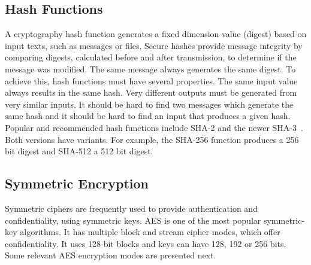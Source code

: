 \subsection{Hash Functions}\label{chap:background:crypto:hash}

A cryptography hash function generates a fixed dimension value (digest) based on input texts, such as messages or files. Secure hashes provide message integrity by comparing digests, calculated before and after transmission, to determine if the message was modified. The same message always generates the same digest.
To achieve this, hash functions must have several properties. The same input value always results in the same hash. Very different outputs must be generated from very similar inputs. It should be hard to find two messages which generate the same hash and it should be hard to find an input that produces a given hash.
Popular and recommended hash functions include \ac{SHA}-2 and the newer \ac{SHA}-3~\cite{dang2015secure}. Both versions have variants. For example, the \ac{SHA}-256 function produces a 256 bit digest and \ac{SHA}-512 a 512 bit digest.

\subsection{Symmetric Encryption}\label{chap:background:crypto:symmetric}

Symmetric ciphers are frequently used to provide authentication and confidentiality, using symmetric keys.
\ac{AES} is one of the most popular symmetric-key algorithms. It has multiple block and stream cipher modes, which offer confidentiality. It uses 128-bit blocks and keys can have 128, 192 or 256 bits. Some relevant AES encryption modes are presented next.

